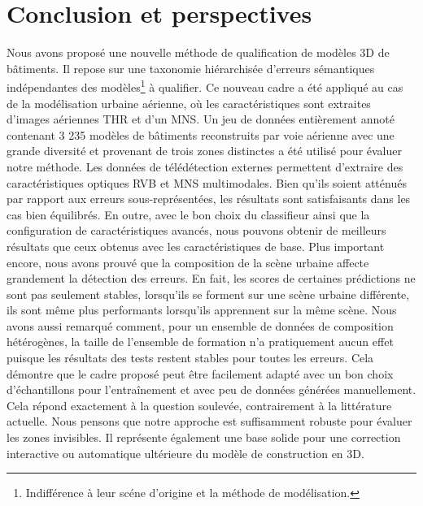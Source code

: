 \section*{Conclusion et perspectives}
    Nous avons proposé une nouvelle méthode de qualification de modèles 3D de bâtiments.
    Il repose sur une taxonomie hiérarchisée d'erreurs sémantiques indépendantes des modèles\footnote{Indifférence à leur scéne d'origine et la méthode de modélisation.} à qualifier.
    Ce nouveau cadre a été appliqué au cas de la modélisation urbaine aérienne, où les caractéristiques sont extraites d'images aériennes THR et d'un MNS.
    Un jeu de données entièrement annoté contenant 3 235 modèles de bâtiments reconstruits par voie aérienne avec une grande diversité et provenant de trois zones distinctes a été utilisé pour évaluer notre méthode.
    Les données de télédétection externes permettent d'extraire des caractéristiques optiques RVB et MNS multimodales.
    Bien qu'ils soient atténués par rapport aux erreurs sous-représentées, les résultats sont satisfaisants dans les cas bien équilibrés.
    En outre, avec le bon choix du classifieur ainsi que la configuration de caractéristiques avancés, nous pouvons obtenir de meilleurs résultats que ceux obtenus avec les caractéristiques de base.
    Plus important encore, nous avons prouvé que la composition de la scène urbaine affecte grandement la détection des erreurs.
    En fait, les scores de certaines prédictions ne sont pas seulement stables, lorsqu'ils se forment sur une scène urbaine différente, ils sont même plus performants lorsqu'ils apprennent sur la même scène.
    Nous avons aussi remarqué comment, pour un ensemble de données de composition hétérogènes, la taille de l'ensemble de formation n'a pratiquement aucun effet puisque les résultats des tests restent stables pour toutes les erreurs.
    Cela démontre que le cadre proposé peut être facilement adapté avec un bon choix d'échantillons pour l'entraînement et avec peu de données générées manuellement.
    Cela répond exactement à la question soulevée, contrairement à la littérature actuelle.
    Nous pensons que notre approche est suffisamment robuste pour évaluer les zones invisibles.
    Il représente également une base solide pour une correction interactive ou automatique ultérieure du modèle de construction en 3D.

